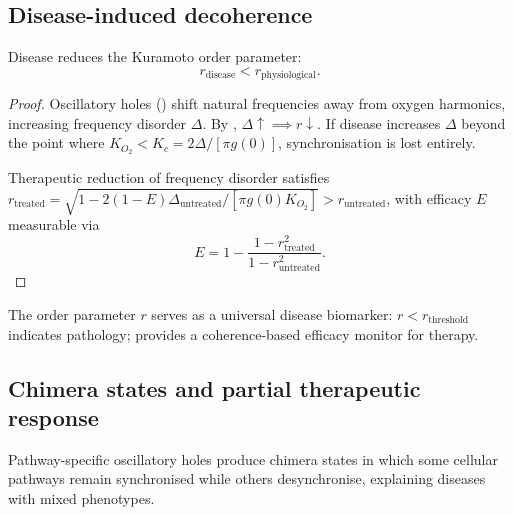 \subsection{Disease-induced decoherence}

\begin{theorem}
\label{thm:ch07-disease-decoherence}
Disease reduces the Kuramoto order parameter:
\begin{equation}
  r_{\mathrm{disease}} < r_{\mathrm{physiological}}.
  \label{eq:ch07-disease-decoherence}
\end{equation}
\end{theorem}

\begin{proof}
Oscillatory holes () shift natural
frequencies away from oxygen harmonics, increasing frequency disorder
$\Delta$.  By , $\Delta \uparrow
\implies r \downarrow$.  If disease increases $\Delta$ beyond the point
where $K_{O_2} < K_c = 2\Delta/[\pi g(0)]$, synchronisation is lost
entirely.

Therapeutic reduction of frequency disorder satisfies
$r_{\mathrm{treated}} = \sqrt{1 - 2(1-E)\Delta_{\mathrm{untreated}}/[\pi g(0) K_{O_2}]}
> r_{\mathrm{untreated}}$, with efficacy $E$ measurable via
\begin{equation}
  E = 1 - \frac{1 - r_{\mathrm{treated}}^2}{1 - r_{\mathrm{untreated}}^2}.
  \label{eq:ch07-efficacy-coherence}
\end{equation}
\end{proof}

\begin{corollary}
\label{cor:ch07-coherence-biomarker}
The order parameter $r$ serves as a universal disease biomarker: $r <
r_{\mathrm{threshold}}$ indicates pathology; 
provides a coherence-based efficacy monitor for therapy.
\end{corollary}

\subsection{Chimera states and partial therapeutic response}

\begin{theorem}
\label{thm:ch07-chimera}
Pathway-specific oscillatory holes produce chimera states in which some
cellular pathways remain synchronised while others desynchronise, explaining
diseases with mixed phenotypes.
\end{theorem}

